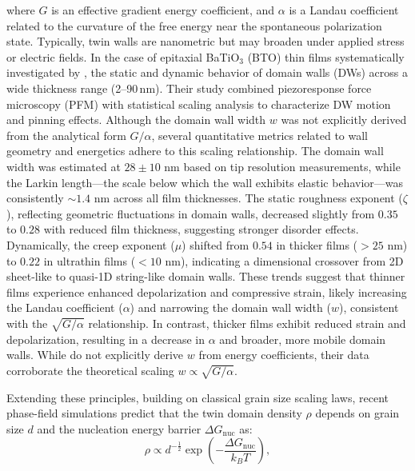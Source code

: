 \documentclass[a4paper,fleqn]{cas-sc}
\begin{document}
where \(G\) is an effective gradient energy coefficient, and \(\alpha\) is a Landau coefficient related to the curvature of the free energy near the spontaneous polarization state. Typically, twin walls are nanometric but may broaden under applied stress or electric fields.  In the case of epitaxial BaTiO$_3$ (BTO) thin films systematically investigated by \cite{kale2024ferroelectric}, the static and dynamic behavior of domain walls (DWs) across a wide thickness range (2--90\,nm). Their study combined piezoresponse force microscopy (PFM) with statistical scaling analysis to characterize DW motion and pinning effects. Although the domain wall width \( w \) was not explicitly derived from the analytical form \( G/\alpha \), several quantitative metrics related to wall geometry and energetics adhere to this scaling relationship. The domain wall width was estimated at \( 28 \pm 10 \) nm based on tip resolution measurements, while the Larkin length---the scale below which the wall exhibits elastic behavior---was consistently \( \sim\!1.4 \) nm across all film thicknesses. The static roughness exponent (\(\zeta\)), reflecting geometric fluctuations in domain walls, decreased slightly from \( 0.35 \) to \( 0.28 \) with reduced film thickness, suggesting stronger disorder effects. Dynamically, the creep exponent (\(\mu\)) shifted from \( 0.54 \) in thicker films (\(>\!25\) nm) to \( 0.22 \) in ultrathin films (\(<\!10\) nm), indicating a dimensional crossover from 2D sheet-like to quasi-1D string-like domain walls. These trends suggest that thinner films experience enhanced depolarization and compressive strain, likely increasing the Landau coefficient (\(\alpha\)) and narrowing the domain wall width (\(w\)), consistent with the \( \sqrt{G/\alpha} \) relationship. In contrast, thicker films exhibit reduced strain and depolarization, resulting in a decrease in \(\alpha\) and broader, more mobile domain walls. While \cite{kale2024ferroelectric} do not explicitly derive \(w\) from energy coefficients, their data corroborate the theoretical scaling \( w \propto \sqrt{G/\alpha} \).
\par Extending these principles, building on classical grain size scaling laws, recent phase-field simulations predict that the twin domain density \( \rho \) depends on grain size \(d\) and the nucleation energy barrier \(\Delta G_{\text{nuc}}\) as:
\begin{equation}
    \rho \propto d^{-\frac{1}{2}} \exp \left(- \frac{\Delta G_{\text{nuc}}}{k_B T} \right),
\end{equation}
\end{document}
